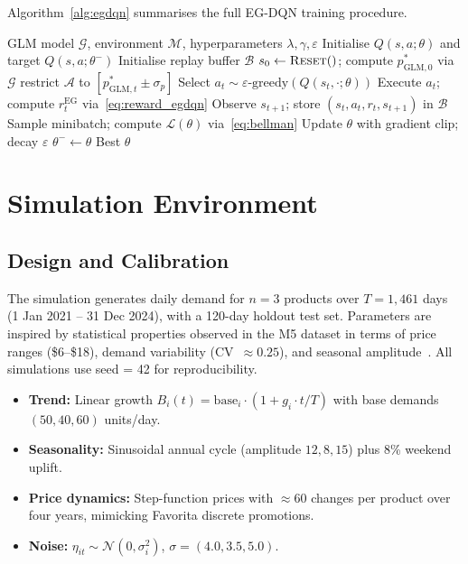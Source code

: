 \documentclass[journal, 10pt, twoside]{IEEEtran}
\begin{document}
Algorithm~\ref{alg:egdqn} summarises the full EG-DQN training procedure.

\begin{algorithm}[H]
\caption{EG-DQN Training}
\label{alg:egdqn}
\begin{algorithmic}[1]
\Require GLM model $\mathcal{G}$, environment $\mathcal{M}$,
         hyperparameters $\lambda, \gamma, \varepsilon$
\State Initialise $Q(s,a;\theta)$ and target $Q(s,a;\theta^-)$
\State Initialise replay buffer $\mathcal{B}$
  \State $s_0 \gets \textsc{Reset}()$; compute $p^*_{\text{GLM},0}$ via $\mathcal{G}$
     restrict $\mathcal{A}$ to $[p^*_{\text{GLM},t}\pm\sigma_p]$
    \EndIf
    \State Select $a_t \sim \varepsilon\text{-greedy}(Q(s_t,\cdot;\theta))$
    \State Execute $a_t$; compute $r_t^{\text{EG}}$ via~\eqref{eq:reward_egdqn}
    \State Observe $s_{t+1}$; store $(s_t,a_t,r_t,s_{t+1})$ in $\mathcal{B}$
    \State Sample minibatch; compute $\mathcal{L}(\theta)$ via~\eqref{eq:bellman}
    \State Update $\theta$ with gradient clip; decay $\varepsilon$
  \EndFor
   $\theta^- \gets \theta$ \EndIf
\EndFor
\Return Best $\theta$
\end{algorithmic}
\end{algorithm}

\section{Simulation Environment}
\label{sec:simulation}

\subsection{Design and Calibration}

The simulation generates daily demand for $n=3$ products over $T=1{,}461$
days (1 Jan 2021 -- 31 Dec 2024), with a 120-day holdout test set.
Parameters are inspired by statistical properties observed in the M5 dataset in terms of
price ranges (\$6--\$18), demand variability (CV~$\approx 0.25$), and
seasonal amplitude~\cite{xia2023}. All simulations use seed = 42 for
reproducibility.

\begin{itemize}
  \item \textbf{Trend:} Linear growth $B_i(t)=\text{base}_i\cdot(1+g_i\cdot t/T)$
    with base demands $(50, 40, 60)$ units/day.
  \item \textbf{Seasonality:} Sinusoidal annual cycle (amplitude
    $12, 8, 15$) plus 8\% weekend uplift.
  \item \textbf{Price dynamics:} Step-function prices with $\approx 60$
    changes per product over four years, mimicking Favorita discrete
    promotions.
  \item \textbf{Noise:} $\eta_{it}\sim\mathcal{N}(0,\sigma_i^2)$,
    $\sigma=(4.0,3.5,5.0)$.
\end{itemize}
\end{document}
